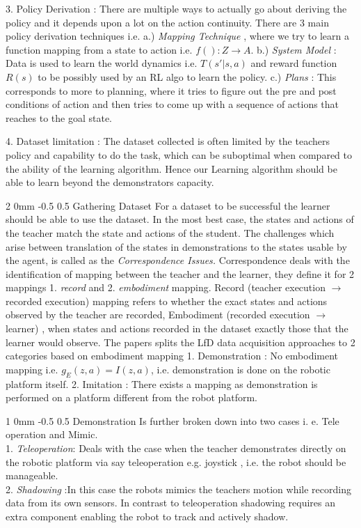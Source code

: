\documentclass[twocolumn,11pt]{article}
\makeatletter
\renewcommand{\section}{\@startsection
{section}%
{2}%
{0mm}%
{-0.5\baselineskip}%
{0.5\baselineskip}%
{\bfseries\color{blue}}} %
\renewcommand{\subsection}{\@startsection
{subsection}%
{1}%
{0mm}%
{-0.5\baselineskip}%
{0.5\baselineskip}%
{\bfseries\color{blue}}} %
\makeatother
\begin{document}
3. Policy Derivation : There are multiple ways to actually go about deriving the policy and it depends upon a lot on the action continuity. There are 3 main policy derivation techniques i.e. a.) \textit{Mapping Technique} , where we try to learn a function mapping from a state to action i.e. $f() : Z \rightarrow A$.
b.) \textit{System Model} : Data is used to learn the world dynamics i.e. $T(s'|s,a)$ and reward function $R(s)$ to be possibly used by an RL algo to learn the policy.
c.) \textit{Plans} : This corresponds to more to planning, where it tries to figure out the pre and post conditions of action and then tries to come up with a sequence of actions that reaches to the goal state.
   
4. Dataset limitation : The dataset collected is often limited by the teachers policy and capability to do the task, which can be suboptimal when compared to the ability of the learning algorithm. Hence our Learning algorithm should be able to learn beyond the demonstrators capacity. 

\section{Gathering Dataset}
For a dataset to be successful the learner should be able to use the dataset. In the most best case, the states and actions of the teacher match the state and actions of the student. The challenges which arise between translation of the states in demonstrations to the states usable by the agent, is called as the \textit{Correspondence Issues.}
Correspondence deals with the identification of mapping between the teacher and the learner, they define it for 2 mappings 1. \textit{record } and 2. \textit{embodiment} mapping. Record (teacher execution $\rightarrow$ recorded execution) mapping refers to whether the exact states and actions observed by the teacher are recorded, Embodiment  (recorded execution  $\rightarrow$ learner) , when states and actions recorded in the dataset exactly those that the learner would observe. The papers splits the LfD data acquisition approaches to 2 categories based on embodiment mapping 
1. Demonstration  : No embodiment mapping i.e. $g_E(z,a) = I(z,a)$, i.e. demonstration is done on the robotic platform itself.
2. Imitation : There exists a mapping as demonstration is performed on a platform different from the robot platform. 

\subsection{Demonstration} Is further broken down into two cases i. e. Tele operation and Mimic.\\
1. \textit{Teleoperation}: Deals with the case when the teacher demonstrates directly on the robotic platform via say teleoperation e.g. joystick , i.e. the robot should be manageable.\\
2. \textit{Shadowing}  :In this case the robots mimics the teachers motion while recording data from its own sensors. In contrast to teleoperation shadowing requires an extra component enabling the robot to track and actively shadow.
\end{document}
